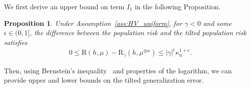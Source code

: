 \documentclass{article}
\theoremstyle{plain}
\theoremstyle{plain}
\newtheorem{proposition}[theorem]{Proposition}
\theoremstyle{definition}
\theoremstyle{remark}
\newcommand{\RTrue}{\mathrm{R}}
\newcommand{\RTET}{\mathrm{R}_{\gamma}}
\begin{document}
We first derive an upper bound on term $I_1$ in the following Proposition.
\begin{proposition}\label{Prop:True-TT_unbounded}
    Under Assumption~\ref{ass:HV_uniform}, for $\gamma<0$ and some $\epsilon\in(0,1]$, 
    the difference between the population risk and the tilted population risk satisfies
     \begin{equation}
        \begin{split}
          &0\leq  \RTrue(h,\mu)- \RTET(h,\mu^{\otimes n})\leq |\gamma|^{\epsilon}\kappa_u^{1+\epsilon}.
        \end{split}
    \end{equation}
\end{proposition}

Then, using Bernstein's inequality~\citep{boucheron2013concentration} and  properties of the logarithm, we can provide upper and lower bounds on the tilted generalization error.
\end{document}
